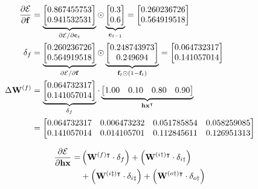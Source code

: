 \documentclass[xcolor={table}]{beamer}
\begin{document}
 \begin{frame} 
\begin{alignat}{2}
	 \frac{\partial \mathcal{E}}{\partial \mathbf{f}} & = \underbrace{\begin{bmatrix} 0.867455753\\ 0.941532531 \end{bmatrix}}_{\partial \mathcal{E}/\partial \mathbf{c}_t} \odot \underbrace{\begin{bmatrix} 0.3\\ 0.6\end{bmatrix}}_{\mathbf{c}_{t{-}1}}  = \begin{bmatrix} 0.260236726\\ 0.564919518 \end{bmatrix}\\
	 \mathbf{\delta}_f & = \underbrace{\begin{bmatrix} 0.260236726\\ 0.564919518 \end{bmatrix}}_{\partial \mathcal{E}/\partial \mathbf{f}} \odot \underbrace{ \begin{bmatrix} 0.248743973\\ 0.249694 \end{bmatrix} }_{\mathbf{f}_t \odot (1-\mathbf{f}_t)} = \begin{bmatrix} 0.064732317\\ 0.141057014 \end{bmatrix}\\
	 \Delta \mathbf{W}^{(f)} & = \underbrace{\begin{bmatrix} 0.064732317\\ 0.141057014 \end{bmatrix}}_{\mathbf{\delta}_f} \cdot \underbrace{\begin{bmatrix} 1.00 & 0.10 & 0.80 & 0.90  \end{bmatrix}}_{\mathbf{hx}^\intercal} \notag\\
	 & = \begin{bmatrix} 
	 0.064732317& 	0.006473232 &	0.051785854 &	0.058259085\\
0.141057014 & 	0.014105701 &	0.112845611 & 	0.126951313
	 \end{bmatrix} \label{eqn:exampleweightupdate}
\end{alignat}
\end{frame} 



 \begin{frame} 
\begin{alignat}{2}
\frac{\partial \mathcal{E}}{\partial \mathbf{hx}} = & \left(\mathbf{W}^{(f)\intercal} \cdot \mathbf{\delta}_f \right) + \left(\mathbf{W}^{(i\dagger)\intercal} \cdot \mathbf{\delta}_{i\dagger}\right)\notag \\ & + \left(\mathbf{W}^{(i\ddagger)\intercal} \cdot \mathbf{\delta}_{i\ddagger}\right) + \left(\mathbf{W}^{(o\dagger)\intercal} \cdot \mathbf{\delta}_{o\dagger}\right) \label{eqn:gradietsEhx}
\end{alignat}
\end{frame} 
\end{document}
